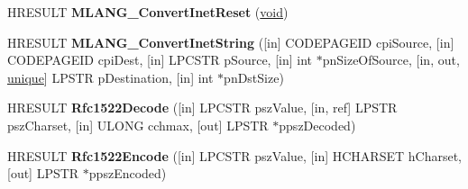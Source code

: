 \begin{DoxyCompactItemize}
\item 
\mbox{\label{interface_m_i_m_e_o_l_e_1_1_i_mime_international_a28cb4807f67b37021d0d619c5fdb08bf}} 
H\+R\+E\+S\+U\+LT {\bfseries M\+L\+A\+N\+G\+\_\+\+Convert\+Inet\+Reset} (\hyperlink{interfacevoid}{void})
\item 
\mbox{\label{interface_m_i_m_e_o_l_e_1_1_i_mime_international_a63dd02b75c1e20bad76cbd56c2df6f83}} 
H\+R\+E\+S\+U\+LT {\bfseries M\+L\+A\+N\+G\+\_\+\+Convert\+Inet\+String} (\mbox{[}in\mbox{]} C\+O\+D\+E\+P\+A\+G\+E\+ID cpi\+Source, \mbox{[}in\mbox{]} C\+O\+D\+E\+P\+A\+G\+E\+ID cpi\+Dest, \mbox{[}in\mbox{]} L\+P\+C\+S\+TR p\+Source, \mbox{[}in\mbox{]} int $\ast$pn\+Size\+Of\+Source, \mbox{[}in, out, \hyperlink{interfaceunique}{unique}\mbox{]} L\+P\+S\+TR p\+Destination, \mbox{[}in\mbox{]} int $\ast$pn\+Dst\+Size)
\item 
\mbox{\label{interface_m_i_m_e_o_l_e_1_1_i_mime_international_a421aa6ef67350522dfa8fb773fac1bca}} 
H\+R\+E\+S\+U\+LT {\bfseries Rfc1522\+Decode} (\mbox{[}in\mbox{]} L\+P\+C\+S\+TR psz\+Value, \mbox{[}in, ref\mbox{]} L\+P\+S\+TR psz\+Charset, \mbox{[}in\mbox{]} U\+L\+O\+NG cchmax, \mbox{[}out\mbox{]} L\+P\+S\+TR $\ast$ppsz\+Decoded)
\item 
\mbox{\label{interface_m_i_m_e_o_l_e_1_1_i_mime_international_ac7816b160607d388ae70b76677a1c5af}} 
H\+R\+E\+S\+U\+LT {\bfseries Rfc1522\+Encode} (\mbox{[}in\mbox{]} L\+P\+C\+S\+TR psz\+Value, \mbox{[}in\mbox{]} H\+C\+H\+A\+R\+S\+ET h\+Charset, \mbox{[}out\mbox{]} L\+P\+S\+TR $\ast$ppsz\+Encoded)
\end{DoxyCompactItemize}
